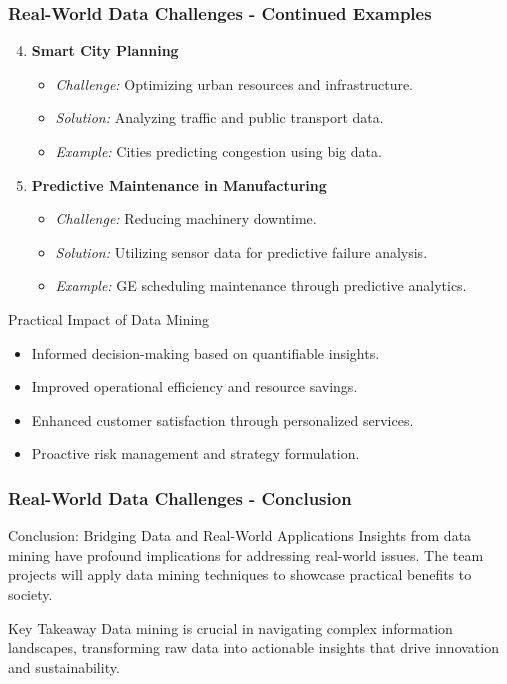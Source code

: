 \documentclass[aspectratio=169]{beamer}
\begin{document}
\begin{frame}[fragile]
    \frametitle{Real-World Data Challenges - Continued Examples}
    \begin{enumerate}
        \setcounter{enumi}{3}
        \item \textbf{Smart City Planning}
            \begin{itemize}
                \item \textit{Challenge:} Optimizing urban resources and infrastructure.
                \item \textit{Solution:} Analyzing traffic and public transport data.
                \item \textit{Example:} Cities predicting congestion using big data.
            \end{itemize}
        
        \item \textbf{Predictive Maintenance in Manufacturing}
            \begin{itemize}
                \item \textit{Challenge:} Reducing machinery downtime.
                \item \textit{Solution:} Utilizing sensor data for predictive failure analysis.
                \item \textit{Example:} GE scheduling maintenance through predictive analytics.
            \end{itemize}
    \end{enumerate}
    
    \begin{block}{Practical Impact of Data Mining}
        \begin{itemize}
            \item Informed decision-making based on quantifiable insights.
            \item Improved operational efficiency and resource savings.
            \item Enhanced customer satisfaction through personalized services.
            \item Proactive risk management and strategy formulation.
        \end{itemize}
    \end{block}
\end{frame}

\begin{frame}[fragile]
    \frametitle{Real-World Data Challenges - Conclusion}
    \begin{block}{Conclusion: Bridging Data and Real-World Applications}
        Insights from data mining have profound implications for addressing real-world issues.
        The team projects will apply data mining techniques to showcase practical benefits to society.
    \end{block}
    
    \begin{block}{Key Takeaway}
        Data mining is crucial in navigating complex information landscapes, transforming raw data into actionable insights that drive innovation and sustainability.
    \end{block}
\end{frame}
\end{document}
